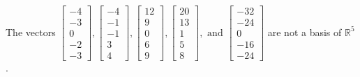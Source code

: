 \begin{exercise}
\begin{exerciseStatement}
  \end{exerciseStatement}
  \begin{exerciseAnswer}
   The vectors \(\left[\begin{array}{r}
-4 \\
-3 \\
0 \\
-2 \\
-3
\end{array}\right] , \left[\begin{array}{r}
-4 \\
-1 \\
-1 \\
3 \\
4
\end{array}\right] , \left[\begin{array}{r}
12 \\
9 \\
0 \\
6 \\
9
\end{array}\right] , \left[\begin{array}{r}
20 \\
13 \\
1 \\
5 \\
8
\end{array}\right] , \text{ and } \left[\begin{array}{r}
-32 \\
-24 \\
0 \\
-16 \\
-24
\end{array}\right]\) 
  	 are not  a basis of \(\mathbb{R}^5\).
  


  \end{exerciseAnswer}
\end{exercise}